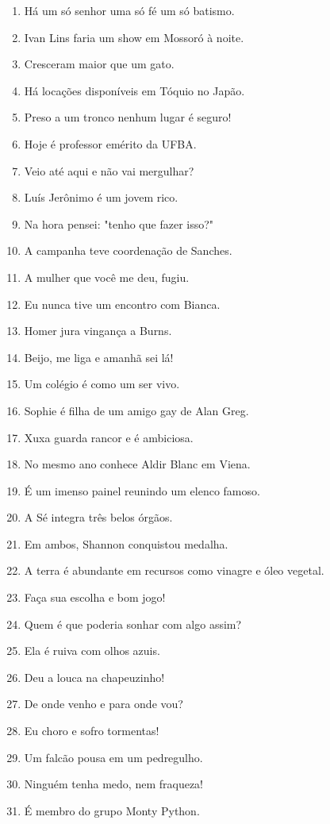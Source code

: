 \begin{enumerate}
\item H\'a um s\'o senhor uma s\'o f\'e um s\'o batismo.
\item Ivan Lins faria um show em Mossor\'o \`a noite.
\item Cresceram maior que um gato.
\item H\'a loca\c{c}\~oes dispon\'iveis em T\'oquio no Jap\~ao.
\item Preso a um tronco nenhum lugar \'e seguro!
\item Hoje \'e professor em\'erito da UFBA.
\item Veio at\'e aqui e n\~ao vai mergulhar?
\item Lu\'is Jer\^onimo \'e um jovem rico.
\item Na hora pensei: "tenho que fazer isso?"
\item A campanha teve coordena\c{c}\~ao de Sanches.
\item A mulher que voc\^e me deu, fugiu.
\item Eu nunca tive um encontro com Bianca.
\item Homer jura vingan\c{c}a a Burns.
\item Beijo, me liga e amanh\~a sei l\'a!
\item Um col\'egio \'e como um ser vivo.
\item Sophie \'e filha de um amigo gay de Alan Greg.
\item Xuxa guarda rancor e \'e ambiciosa.
\item No mesmo ano conhece Aldir Blanc em Viena.
\item \'E um imenso painel reunindo um elenco famoso.
\item A S\'e integra tr\^es belos \'org\~aos.
\item Em ambos, Shannon conquistou medalha.
\item A terra \'e abundante em recursos como vinagre e \'oleo vegetal.
\item Fa\c{c}a sua escolha e bom jogo!
\item Quem \'e que poderia sonhar com algo assim?
\item Ela \'e ruiva com olhos azuis.
\item Deu a louca na chapeuzinho!
\item De onde venho e para onde vou?
\item Eu choro e sofro tormentas!
\item Um falc\~ao pousa em um pedregulho.
\item Ningu\'em tenha medo, nem fraqueza!
\item \'E membro do grupo Monty Python.

\end{enumerate}
